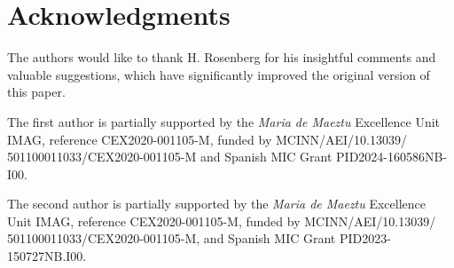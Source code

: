 \documentclass[11pt]{article}
\numberwithin{equation} {section}
\begin{document}
\section*{Acknowledgments}

The authors would like to thank H. Rosenberg for his insightful comments and valuable suggestions, which have significantly improved the original version of this paper.

The first author is partially supported by the {\it Maria de Maeztu} Excellence Unit IMAG, reference CEX2020-001105-M, funded by MCINN/AEI/10.13039/ 501100011033/CEX2020-001105-M and  Spanish MIC Grant PID2024-160586NB-I00.

The second author is partially supported by the {\it Maria de Maeztu} Excellence Unit IMAG, reference CEX2020-001105-M, funded by MCINN/AEI/10.13039/ 501100011033/CEX2020-001105-M, and Spanish MIC Grant PID2023-150727NB.I00.
\end{document}
